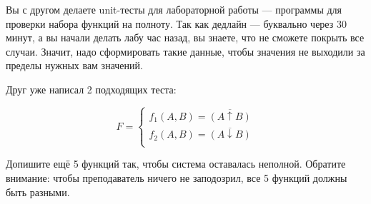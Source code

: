 \question
Вы с другом делаете unit-тесты для лабораторной работы — программы для проверки набора функций на полноту. Так как дедлайн — буквально через 30 минут, а вы начали делать лабу час назад, вы знаете, что не сможете покрыть все случаи. Значит, надо сформировать такие данные, чтобы значения не выходили за пределы нужных вам значений.

Друг уже написал 2 подходящих теста:

\begin{equation*}
    F=
    \begin{cases}
        f_1(A,B)=\overline{(A \uparrow B)}\\
        f_2(A,B)=\overline{(A \downarrow B)}\\
    \end{cases}
\end{equation*}
    
Допишите ещё 5 функций так, чтобы система оставалась неполной. Обратите внимание: чтобы преподаватель ничего не заподозрил, все 5 функций должны быть разными.